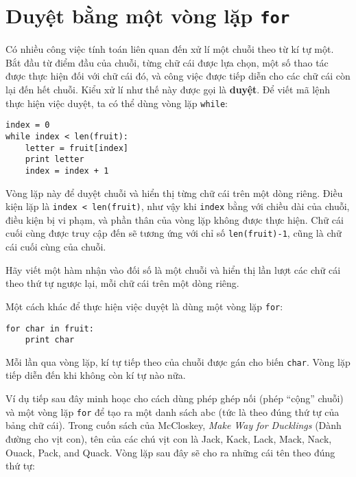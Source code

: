 \documentclass[11pt]{book}
\begin{document}


\section{Duyệt bằng một vòng lặp {\tt for}}
\label{for}


Có nhiều công việc tính toán liên quan đến xử lí một chuỗi theo từ
kí tự một. Bắt đầu từ điểm đầu của chuỗi, từng chữ cái được lựa chọn,
một số thao tác được thực hiện đối với chữ cái đó, và công việc được
tiếp diễn cho các chữ cái còn lại đến hết chuỗi. Kiểu xử lí như thế này
được gọi là {\bf duyệt}. Để viết mã lệnh thực hiện việc duyệt, ta có thể
dùng vòng lặp {\tt while}:

\beforeverb
\begin{verbatim}
index = 0
while index < len(fruit):
    letter = fruit[index]
    print letter
    index = index + 1
\end{verbatim}
\afterverb
%
Vòng lặp này để duyệt chuỗi và hiển thị từng chữ cái trên một dòng riêng.
Điều kiện lặp là {\tt index < len(fruit)}, như vậy khi {\tt index} bằng với
chiều dài của chuỗi, điều kiện bị vi phạm, và phần thân của vòng lặp
không được thực hiện. Chữ cái cuối cùng được truy cập đến sẽ tương ứng
với chỉ số {\tt len(fruit)-1}, cũng là chữ cái cuối cùng của chuỗi.

\begin{ex}
Hãy viết một hàm nhận vào đối số là một chuỗi và hiển thị lần lượt
các chữ cái theo thứ tự ngược lại, mỗi chữ cái trên một dòng riêng.
\end{ex}

Một cách khác để thực hiện việc duyệt là dùng một vòng lặp {\tt for}:

\beforeverb
\begin{verbatim}
for char in fruit:
    print char
\end{verbatim}
\afterverb
%
Mỗi lần qua vòng lặp, kí tự tiếp theo của chuỗi được gán cho biến {\tt char}. 
Vòng lặp tiếp diễn đến khi không còn kí tự nào nữa.


Ví dụ tiếp sau đây minh hoạc cho cách dùng phép ghép nối (phép ``cộng'' chuỗi)
và một vòng lặp {\tt for} để tạo ra một danh sách abc (tức là theo đúng thứ tự của
bảng chữ cái). Trong cuốn sách của McCloskey, {\em Make
Way for Ducklings} (Dành đường cho vịt con), tên của các chú vịt con là Jack, Kack, Lack,
Mack, Nack, Ouack, Pack, and Quack.  Vòng lặp sau đây sẽ cho ra những cái tên theo
đúng thứ tự:
\end{document}
